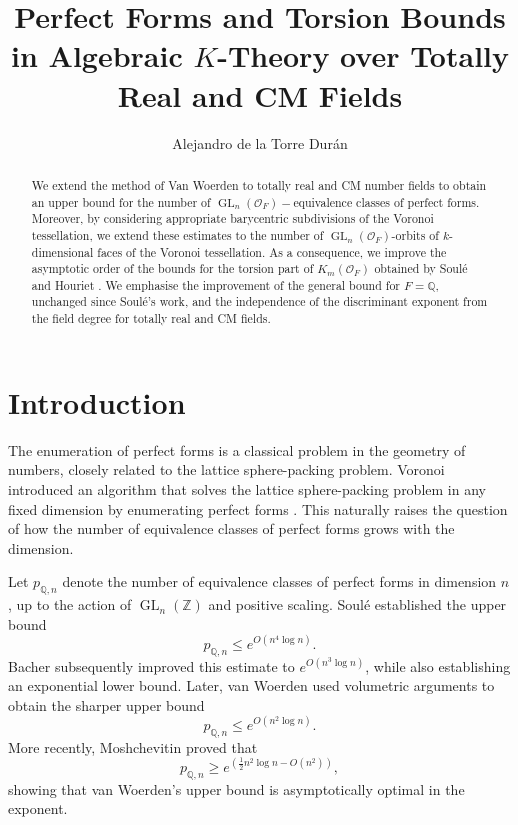 \documentclass[11pt,a4paper,twoside]{amsart}
\title[{\SMALL Perfect Forms and Torsion Bounds in Algebraic $K$)-Theory }]{Perfect Forms and Torsion Bounds in Algebraic $K$-Theory over Totally Real and CM Fields}
\author{Alejandro de la Torre Durán}
\theoremstyle{plain}
\theoremstyle{definition}
\newcommand{\rint}[0]{\mathcal{O}_F}
\newcommand{\GL}[0]{\operatorname{GL}_n(\mathbb{Z})}
\newcommand{\GLo}[0]{\operatorname{GL}_n({\mathcal{O}_F})}
\renewcommand{\leq}{\leqslant}
\renewcommand{\geq}{\geqslant}
\begin{document}
\begin{abstract}
   We extend the method of Van Woerden \cite{woerden} to totally real and CM number fields to obtain an upper bound for the number of $\GLo-$equivalence classes of perfect forms. Moreover, by considering appropriate barycentric subdivisions of the Voronoi tessellation, we extend these estimates to the number of $\GLo$-orbits of $k$-dimensional faces of the Voronoi tessellation.
 As a consequence, we improve the asymptotic order of the bounds for the torsion part of $K_m(\rint)$ obtained by Soulé \cite{soule_hermitian_bounds} and Houriet \cite{Juliet_PHD}. We emphasise the improvement of the general bound for $F=\mathbb Q$, unchanged since Soulé's work, and the independence of the discriminant exponent from the field degree for totally real and CM fields.
\end{abstract}
\maketitle


\section*{Introduction}

The enumeration of perfect forms is a classical problem in the geometry of numbers, closely related to the lattice sphere-packing problem. Voronoi introduced an algorithm that solves the lattice sphere-packing problem in any fixed dimension by enumerating perfect forms \cite{Voronoi1908}. This naturally raises the question of how the number of equivalence classes of perfect forms grows with the dimension.

Let $p_{\mathbb{Q},n}$ denote the number of equivalence classes of perfect forms in dimension $n$, up to the action of $\GL$ and positive scaling. Soulé \cite{soule_bounds} established the upper bound
$$
p_{\mathbb{Q},n}\leq e^{O(n^4\log n)}.
$$
Bacher \cite{bacher} subsequently improved this estimate to $e^{O(n^3\log n)}$, while also establishing an exponential lower bound. Later, van Woerden \cite{woerden} used volumetric arguments to obtain the sharper upper bound
$$
p_{\mathbb{Q},n}\leq e^{O(n^2\log n)}.
$$
More recently, Moshchevitin \cite{moshchevitin2026} proved that
$$
p_{\mathbb Q,n} \geq e^{\left(\frac12 n^2\log n-O(n^2)\right)},
$$
showing that van Woerden's upper bound is asymptotically optimal in the exponent.
\end{document}
